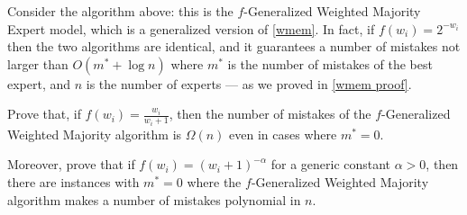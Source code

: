 \documentclass[a4paper, 12pt]{report}
\begin{document}
    \begin{framedprob}{}
        Consider the algorithm above: this is the $f$-Generalized Weighted Majority Expert model, which is a generalized version of \cref{wmem}. In fact, if $f(w_i) = 2^{-w_i}$ then the two algorithms are identical, and it guarantees a number of mistakes not larger than $O(m^* + \log n)$ where $m^*$ is the number of mistakes of the best expert, and $n$ is the number of experts --- as we proved in \cref{wmem proof}.

        Prove that, if $f(w_i) = \tfrac{w_i}{w_i + 1}$, then the number of mistakes of the $f$-Generalized Weighted Majority algorithm is $\Omega(n)$ even in cases where $m^* = 0$.

        Moreover, prove that if $f(w_i) = (w_i + 1)^{- \alpha}$ for a generic constant $\alpha > 0$, then there are instances with $m^* =0$ where the $f$-Generalized Weighted Majority algorithm makes a number of mistakes polynomial in $n$.
    \end{framedprob}
\end{document}
